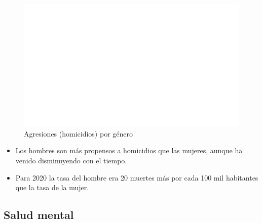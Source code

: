     \begin{figure}[H]
        \caption{Agresiones (homicidios) por género \label{map_result_2} }
        \begin{center}
        \includegraphics[width=\textwidth,keepaspectratio]{img/var_286_map.png}
        \end{center}
    \end{figure}
            \begin{itemize}
                \item Los hombres son más propensos a homicidios que las mujeres, aunque ha venido disminuyendo con el tiempo.
                \item Para 2020 la tasa del hombre era 20 muertes más por cada 100 mil habitantes que la tasa de la mujer.
                \end{itemize}

    \subsection{Salud mental}

